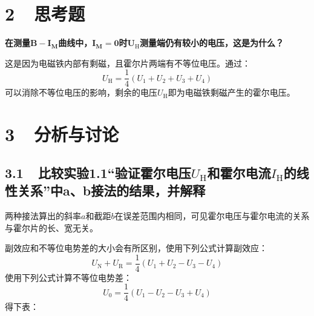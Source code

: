 \documentclass[a4paper,fontset=windows]{ctexart}
\begin{document}
    \newpage
    \section*{2\ \ 思考题}

    \textbf{在测量$\boldsymbol{B-I_M}$曲线中，$\boldsymbol{I_M = 0}$时$\boldsymbol{U_\mathrm{H}}$测量端仍有较小的电压，这是为什么？}

    这是因为电磁铁内部有剩磁，且霍尔片两端有不等位电压。通过：
    \[
    U_\mathrm{H} = \frac{1}{4}(U_1 + U_2 + U_3 + U_4)
    \]
    可以消除不等位电压的影响，剩余的电压$U_\mathrm{H}$即为电磁铁剩磁产生的霍尔电压。

    \newpage
    \section*{3\ \ 分析与讨论}

    \subsection*{3.1\ \ 比较实验1.1“验证霍尔电压$U_\mathrm{H}$和霍尔电流$I_\mathrm{H}$的线性关系”中a、b接法的结果，并解释}

    两种接法算出的斜率$a$和截距$b$在误差范围内相同，可见霍尔电压与霍尔电流的关系与霍尔片的长、宽无关。

    副效应和不等位电势差的大小会有所区别，使用下列公式计算副效应：
    \[
    U_\mathrm{N} + U_\mathrm{R} = \frac{1}{4}(U_1 + U_2 - U_3 - U_4)
    \]
    使用下列公式计算不等位电势差：
    \[
    U_0 = \frac{1}{4}(U_1 - U_2 - U_3 + U_4)
    \]
    得下表：
\end{document}
